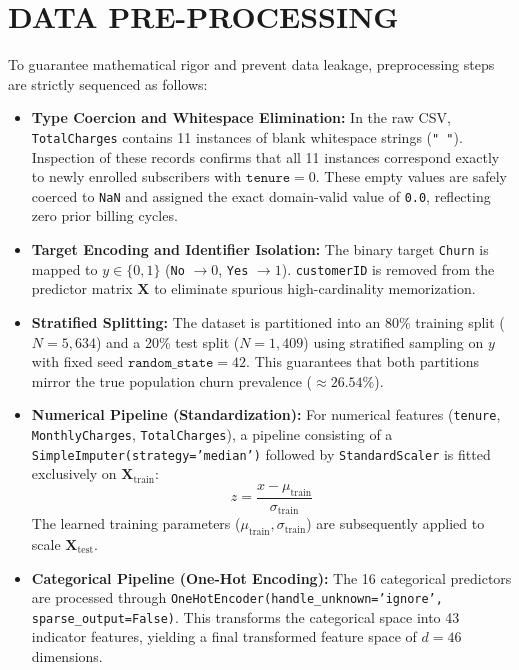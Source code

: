 \documentclass[12pt,a4paper]{report}
\newcommand{\datasetTrainCount}{5,634}
\newcommand{\datasetTestCount}{1,409}
\begin{document}
\section{DATA PRE-PROCESSING}
To guarantee mathematical rigor and prevent data leakage, preprocessing steps are strictly sequenced as follows:
\begin{itemize}
    \item \textbf{Type Coercion and Whitespace Elimination:} In the raw CSV, \texttt{TotalCharges} contains 11 instances of blank whitespace strings (\texttt{" "}). Inspection of these records confirms that all 11 instances correspond exactly to newly enrolled subscribers with $\texttt{tenure} = 0$. These empty values are safely coerced to \texttt{NaN} and assigned the exact domain-valid value of \texttt{0.0}, reflecting zero prior billing cycles.
    \item \textbf{Target Encoding and Identifier Isolation:} The binary target \texttt{Churn} is mapped to $y \in \{0, 1\}$ (\texttt{No} $\to 0$, \texttt{Yes} $\to 1$). \texttt{customerID} is removed from the predictor matrix $\mathbf{X}$ to eliminate spurious high-cardinality memorization.
    \item \textbf{Stratified Splitting:} The dataset is partitioned into an 80\% training split ($N=\datasetTrainCount{}$) and a 20\% test split ($N=\datasetTestCount{}$) using stratified sampling on $y$ with fixed seed $\texttt{random\_state}=42$. This guarantees that both partitions mirror the true population churn prevalence ($\approx 26.54\%$).
    \item \textbf{Numerical Pipeline (Standardization):} For numerical features (\texttt{tenure}, \texttt{MonthlyCharges}, \texttt{TotalCharges}), a pipeline consisting of a \texttt{SimpleImputer(strategy='median')} followed by \texttt{StandardScaler} is fitted exclusively on $\mathbf{X}_{\text{train}}$:
    \begin{equation}
        z = \frac{x - \mu_{\text{train}}}{\sigma_{\text{train}}}
    \end{equation}
    The learned training parameters ($\mu_{\text{train}}, \sigma_{\text{train}}$) are subsequently applied to scale $\mathbf{X}_{\text{test}}$.
    \item \textbf{Categorical Pipeline (One-Hot Encoding):} The 16 categorical predictors are processed through \texttt{OneHotEncoder(handle\_unknown='ignore', sparse\_output=False)}. This transforms the categorical space into 43 indicator features, yielding a final transformed feature space of $d=46$ dimensions.
\end{itemize}
\end{document}
